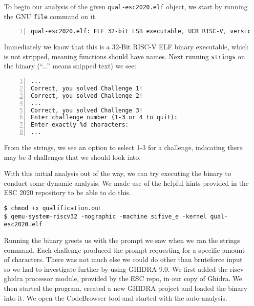 To begin our analysis of the given \texttt{qual-esc2020.elf} object, we start by running the GNU \texttt{file} command on it.
\begin{lstlisting}[numbers=left,language=none]
    qual-esc2020.elf: ELF 32-bit LSB executable, UCB RISC-V, version 1 (SYSV), statically linked, not stripped
\end{lstlisting}
Immediately we know that this is a 32-Bit RISC-V ELF binary executable, which is not stripped, meaning functions should have names.
Next running \texttt{strings} on the binary (``...'' means snipped text) we see:
\begin{lstlisting}[numbers=left,language=none]
...
Correct, you solved Challenge 1!
Correct, you solved Challenge 2!
...
Correct, you solved Challenge 3!
Enter challenge number (1-3 or 4 to quit):
Enter exactly %d characters:
...
\end{lstlisting}
From the strings, we see an option to select 1-3 for a challenge, indicating there may be 3 challenges that we should look into.

With this initial analysis out of the way, we can try executing the binary to conduct some dynamic analysis. We made use of the helpful hints provided in the ESC 2020 repository to be able to do this.

\begin{lstlisting}[language=none]
$ chmod +x qualification.out
$ qemu-system-riscv32 -nographic -machine sifive_e -kernel qual-esc2020.elf
\end{lstlisting}

Running the binary greets us with the prompt we saw when we ran the strings command. Each challenge produced the prompt requesting for a specific amount of characters. There was not much else we could do other than bruteforce input so we had to investigate further by using GHIDRA 9.0.
We first added the riscv ghidra processor module, provided by the ESC repo, in our copy of Ghidra. We then started the program, created a new GHIDRA project and loaded the binary into it. We open the CodeBrowser tool and started with the auto-analysis.
